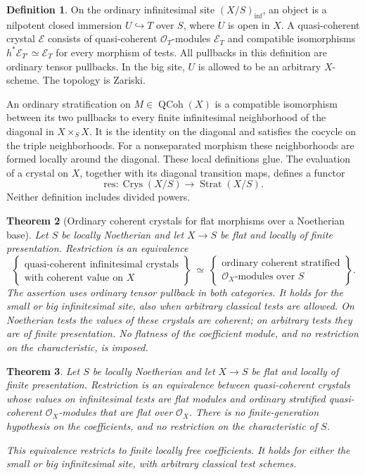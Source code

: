 \documentclass[11pt]{article}
\newcommand{\OO}{\mathcal O}\newcommand{\Fp}{\mathbf F_p}
\DeclareMathOperator{\QCoh}{QCoh}\DeclareMathOperator{\Crys}{Crys}
\DeclareMathOperator{\Strat}{Strat}
\newtheorem{theorem}{Theorem}[section]
\theoremstyle{definition}\newtheorem{definition}[theorem]{Definition}
\theoremstyle{remark}\newtheorem{remark}[theorem]{Remark}
\begin{document}
\begin{definition}
On the ordinary infinitesimal site $(X/S)_{\mathrm{inf}}$, an object is a nilpotent closed immersion $U\hookrightarrow T$ over $S$, where $U$ is open in $X$. A quasi-coherent crystal $\mathcal E$ consists of quasi-coherent $\OO_T$-modules $\mathcal E_T$ and compatible isomorphisms $h^*\mathcal E_{T'}\simeq\mathcal E_T$ for every morphism of tests. All pullbacks in this definition are ordinary tensor pullbacks. In the big site, $U$ is allowed to be an arbitrary $X$-scheme. The topology is Zariski.

An ordinary stratification on $M\in\QCoh(X)$ is a compatible isomorphism between its two pullbacks to every finite infinitesimal neighborhood of the diagonal in $X\times_SX$. It is the identity on the diagonal and satisfies the cocycle on the triple neighborhoods. For a nonseparated morphism these neighborhoods are formed locally around the diagonal. These local definitions glue. The evaluation of a crystal on $X$, together with its diagonal transition maps, defines a functor
\[
 \mathrm{res}:\Crys(X/S)\longrightarrow\Strat(X/S).
\]
Neither definition includes divided powers.
\end{definition}

\begin{theorem}[Ordinary coherent crystals for flat morphisms over a Noetherian base]\label{thm:coherent}
Let $S$ be locally Noetherian and let $X\to S$ be flat and locally of finite presentation.  Restriction is an equivalence
\[
 \left\{\begin{array}{c}
 \text{quasi-coherent infinitesimal crystals}\\
 \text{with coherent value on }X
 \end{array}\right\}
 \ \simeq\
 \left\{\begin{array}{c}
 \text{ordinary coherent stratified}\\
 \OO_X\text{-modules over }S
 \end{array}\right\}.
\]
The assertion uses ordinary tensor pullback in both categories.  It holds for the small or big infinitesimal site, also when arbitrary classical tests are allowed.  On Noetherian tests the values of these crystals are coherent; on arbitrary tests they are of finite presentation.  No flatness of the coefficient module, and no restriction on the characteristic, is imposed.


\end{theorem}

\begin{theorem}\label{thm:flat}
Let $S$ be locally Noetherian and let $X\to S$ be flat and locally of finite presentation.  Restriction is an equivalence between quasi-coherent crystals whose values on infinitesimal tests are flat modules and ordinary stratified quasi-coherent $\OO_X$-modules that are flat over $\OO_X$.  There is no finite-generation hypothesis on the coefficients, and no restriction on the characteristic of $S$.

This equivalence restricts to finite locally free coefficients.  It holds for either the small or big infinitesimal site, with arbitrary classical test schemes.
\end{theorem}
\end{document}
